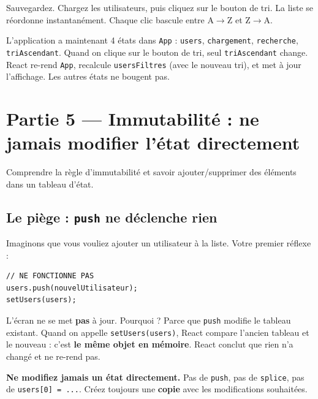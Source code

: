 \documentclass[11pt,a4paper]{article}
\begin{document}
Sauvegardez. Chargez les utilisateurs, puis cliquez sur le bouton de tri. La liste se réordonne instantanément. Chaque clic bascule entre A$\to$Z et Z$\to$A.

\begin{infobox}
L'application a maintenant 4 états dans \texttt{App} : \texttt{users}, \texttt{chargement}, \texttt{recherche}, \texttt{triAscendant}. Quand on clique sur le bouton de tri, seul \texttt{triAscendant} change. React re-rend \texttt{App}, recalcule \texttt{usersFiltres} (avec le nouveau tri), et met à jour l'affichage. Les autres états ne bougent pas.
\end{infobox}

\section{Partie 5 --- Immutabilité : ne jamais modifier l'état directement}
\label{sec:immutabilite}

\begin{objectifbox}
Comprendre la règle d'immutabilité et savoir ajouter/supprimer des éléments dans un tableau d'état.
\end{objectifbox}

\subsection{Le piège : \texttt{push} ne déclenche rien}

Imaginons que vous vouliez ajouter un utilisateur à la liste. Votre premier réflexe :

\begin{lstlisting}
// NE FONCTIONNE PAS
users.push(nouvelUtilisateur);
setUsers(users);
\end{lstlisting}

L'écran ne se met \textbf{pas} à jour. Pourquoi ? Parce que \texttt{push} modifie le tableau existant. Quand on appelle \texttt{setUsers(users)}, React compare l'ancien tableau et le nouveau : c'est \textbf{le même objet en mémoire}. React conclut que rien n'a changé et ne re-rend pas.

\begin{attentionbox}[La règle d'or]
\textbf{Ne modifiez jamais un état directement.} Pas de \texttt{push}, pas de \texttt{splice}, pas de \texttt{users[0] = ...}. Créez toujours une \textbf{copie} avec les modifications souhaitées.
\end{attentionbox}
\end{document}
